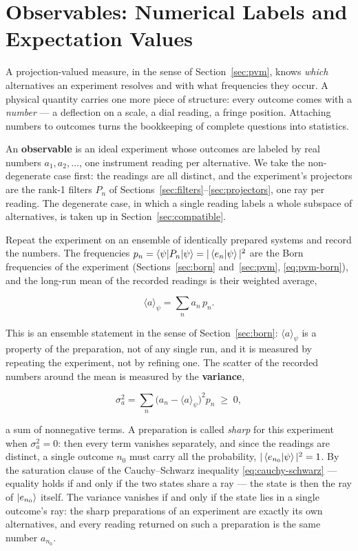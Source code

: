 \section{Observables: Numerical Labels and Expectation Values}
\label{sec:observables}

A projection-valued measure, in the sense of Section~\ref{sec:pvm}, knows \emph{which} alternatives an experiment resolves and with what frequencies they occur. A physical quantity carries one more piece of structure: every outcome comes with a \emph{number} --- a deflection on a scale, a dial reading, a fringe position. Attaching numbers to outcomes turns the bookkeeping of complete questions into statistics.

An \textbf{observable} is an ideal experiment whose outcomes are labeled by real numbers $a_1,a_2,\dots$, one instrument reading per alternative. We take the non-degenerate case first: the readings are all distinct, and the experiment's projectors are the rank-1 filters $P_n$ of Sections~\ref{sec:filters}--\ref{sec:projectors}, one ray per reading. The degenerate case, in which a single reading labels a whole subspace of alternatives, is taken up in Section~\ref{sec:compatible}.

Repeat the experiment on an ensemble of identically prepared systems and record the numbers. The frequencies $p_n=\braket{\psi|P_n|\psi}=|\braket{e_n|\psi}|^2$ are the Born frequencies of the experiment (Sections~\ref{sec:born} and~\ref{sec:pvm}, \eqref{eq:pvm-born}), and the long-run mean of the recorded readings is their weighted average,
\begin{linenomath}
\begin{equation}
    \langle a\rangle_\psi=\sum_n a_n\,p_n .
    \label{eq:expectation-frequency}
\end{equation}
\end{linenomath}
This is an ensemble statement in the sense of Section~\ref{sec:born}: $\langle a\rangle_\psi$ is a property of the preparation, not of any single run, and it is measured by repeating the experiment, not by refining one. The scatter of the recorded numbers around the mean is measured by the \textbf{variance},
\begin{linenomath}
\begin{equation}
    \sigma_a^2=\sum_n\bigl(a_n-\langle a\rangle_\psi\bigr)^2 p_n\;\geq\;0 ,
\end{equation}
\end{linenomath}
a sum of nonnegative terms. A preparation is called \emph{sharp} for this experiment when $\sigma_a^2=0$: then every term vanishes separately, and since the readings are distinct, a single outcome $n_0$ must carry all the probability, $|\braket{e_{n_0}|\psi}|^2=1$. By the saturation clause of the Cauchy--Schwarz inequality \eqref{eq:cauchy-schwarz} --- equality holds if and only if the two states share a ray --- the state is then the ray of $\ket{e_{n_0}}$ itself. The variance vanishes if and only if the state lies in a single outcome's ray: the sharp preparations of an experiment are exactly its own alternatives, and every reading returned on such a preparation is the same number $a_{n_0}$.

